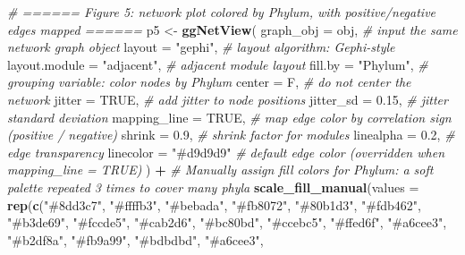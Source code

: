 \documentclass[
]{book}
\newenvironment{Shaded}{\begin{snugshade}}{\end{snugshade}}
\newcommand{\AttributeTok}[1]{\textcolor[rgb]{0.13,0.29,0.53}{#1}}
\newcommand{\CommentTok}[1]{\textcolor[rgb]{0.56,0.35,0.01}{\textit{#1}}}
\newcommand{\ConstantTok}[1]{\textcolor[rgb]{0.56,0.35,0.01}{#1}}
\newcommand{\FloatTok}[1]{\textcolor[rgb]{0.00,0.00,0.81}{#1}}
\newcommand{\FunctionTok}[1]{\textcolor[rgb]{0.13,0.29,0.53}{\textbf{#1}}}
\newcommand{\NormalTok}[1]{#1}
\newcommand{\OtherTok}[1]{\textcolor[rgb]{0.56,0.35,0.01}{#1}}
\newcommand{\SpecialCharTok}[1]{\textcolor[rgb]{0.81,0.36,0.00}{\textbf{#1}}}
\newcommand{\StringTok}[1]{\textcolor[rgb]{0.31,0.60,0.02}{#1}}
\begin{document}
\begin{Shaded}
\begin{Highlighting}[]
\CommentTok{\# ====== Figure 5: network plot colored by Phylum, with positive/negative edges mapped ======}
\NormalTok{p5 }\OtherTok{\textless{}{-}} \FunctionTok{ggNetView}\NormalTok{(}
  \AttributeTok{graph\_obj     =}\NormalTok{ obj,           }\CommentTok{\# input the same network graph object}
  \AttributeTok{layout        =} \StringTok{"gephi"}\NormalTok{,       }\CommentTok{\# layout algorithm: Gephi{-}style}
  \AttributeTok{layout.module =} \StringTok{"adjacent"}\NormalTok{,    }\CommentTok{\# adjacent module layout}
  \AttributeTok{fill.by       =} \StringTok{"Phylum"}\NormalTok{,      }\CommentTok{\# grouping variable: color nodes by Phylum}
  \AttributeTok{center        =}\NormalTok{ F,             }\CommentTok{\# do not center the network}
  \AttributeTok{jitter        =} \ConstantTok{TRUE}\NormalTok{,          }\CommentTok{\# add jitter to node positions}
  \AttributeTok{jitter\_sd     =} \FloatTok{0.15}\NormalTok{,          }\CommentTok{\# jitter standard deviation}
  \AttributeTok{mapping\_line  =} \ConstantTok{TRUE}\NormalTok{,          }\CommentTok{\# map edge color by correlation sign (positive / negative)}
  \AttributeTok{shrink        =} \FloatTok{0.9}\NormalTok{,           }\CommentTok{\# shrink factor for modules}
  \AttributeTok{linealpha     =} \FloatTok{0.2}\NormalTok{,           }\CommentTok{\# edge transparency}
  \AttributeTok{linecolor     =} \StringTok{"\#d9d9d9"}      \CommentTok{\# default edge color (overridden when mapping\_line = TRUE)}
\NormalTok{) }\SpecialCharTok{+} 
  \CommentTok{\# Manually assign fill colors for Phylum: a soft palette repeated 3 times to cover many phyla}
  \FunctionTok{scale\_fill\_manual}\NormalTok{(}\AttributeTok{values =} \FunctionTok{rep}\NormalTok{(}\FunctionTok{c}\NormalTok{(}\StringTok{"\#8dd3c7"}\NormalTok{, }
                                   \StringTok{"\#ffffb3"}\NormalTok{, }\StringTok{"\#bebada"}\NormalTok{, }\StringTok{"\#fb8072"}\NormalTok{, }\StringTok{"\#80b1d3"}\NormalTok{, }
                                   \StringTok{"\#fdb462"}\NormalTok{, }\StringTok{"\#b3de69"}\NormalTok{, }\StringTok{"\#fccde5"}\NormalTok{, }\StringTok{"\#cab2d6"}\NormalTok{, }
                                   \StringTok{"\#bc80bd"}\NormalTok{, }\StringTok{"\#ccebc5"}\NormalTok{, }\StringTok{"\#ffed6f"}\NormalTok{, }\StringTok{"\#a6cee3"}\NormalTok{, }
                                   \StringTok{"\#b2df8a"}\NormalTok{, }\StringTok{"\#fb9a99"}\NormalTok{, }\StringTok{"\#bdbdbd"}\NormalTok{, }\StringTok{"\#a6cee3"}\NormalTok{, }

\end{Highlighting}
\end{Shaded}
\end{document}
